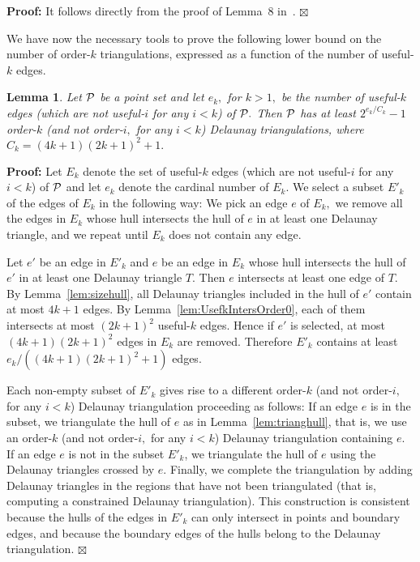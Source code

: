 \documentclass {journal}
\newtheorem {lemma} {Lemma}
\newenvironment {proof}{\textbf {Proof:}}{\hfill \ensuremath {\boxtimes}}
\newcommand{\Pts}{\cal P}
\begin{document}
\begin{proof}
It follows directly from the proof of Lemma~8
in~\cite{ghk-hodt-02}.
\end{proof}


We have now the necessary tools to prove the following lower bound on the number of order-$k$ triangulations, expressed as a function of the number of useful-$k$ edges.

\begin{lemma}\label{lem:k_flippable}
Let $\Pts$ be a point set and let $e_k,$ for $k>1,$ be the number
of useful-$k$ edges (which are not useful-$i$ for any $i<k$) of
$\Pts.$ Then $\Pts$ has at least $2^{e_k/C_k}-1$ order-$k$ (and
not order-$i,$ for any $i < k$) Delaunay triangulations, where
$C_k=(4k+1)(2k+1)^2+1.$
\end{lemma}

\begin{proof}
Let $E_k$ denote the set of useful-$k$ edges (which are not
useful-$i$ for any $i<k$) of $\Pts$ and let $e_k$ denote the
cardinal number of $E_k.$ We select a subset $E'_k$ of the edges
of $E_k$ in the following way: We pick an edge $e$ of $E_k,$ we
remove all the edges in $E_k$ whose hull intersects the hull of
$e$ in at least one Delaunay triangle, and we repeat until $E_k$
does not contain any edge.

Let $e'$ be an edge in $E'_k$ and $e$ be an edge in $E_k$ whose
hull intersects the hull of $e'$ in at least one Delaunay triangle
$T.$ Then $e$ intersects at least one edge of $T.$ By
Lemma~\ref{lem:sizehull}, all Delaunay triangles included in the
hull of $e'$ contain at most $4k+1$ edges. By
Lemma~\ref{lem:UsefkIntersOrder0}, each of them intersects at most
$(2k+1)^2$ useful-$k$ edges. Hence if $e'$ is selected, at most
$(4k+1)(2k+1)^2$ edges in $E_k$ are removed. Therefore $E'_k$
contains at least $e_k/((4k+1)(2k+1)^2+1)$ edges.

Each non-empty subset of $E'_k$ gives rise to a different
order-$k$ (and not order-$i,$ for any $i < k$) Delaunay
triangulation proceeding as follows: If an edge $e$ is in the
subset, we triangulate the hull of $e$ as in
Lemma~\ref{lem:trianghull}, that is, we use an order-$k$ (and not
order-$i,$ for any $i < k$) Delaunay triangulation containing $e.$
If an edge $e$ is not in the subset $E'_k$, we triangulate the hull of
$e$ using the Delaunay triangles crossed by $e.$
Finally, we complete the
triangulation by adding Delaunay triangles in the regions that
have not been triangulated (that is, computing a constrained Delaunay
triangulation). This construction is consistent because the hulls
of the edges in $E'_k$ can only intersect in points and boundary
edges, and because the boundary edges of the hulls belong to the
Delaunay triangulation.
\end{proof}
\end{document}
